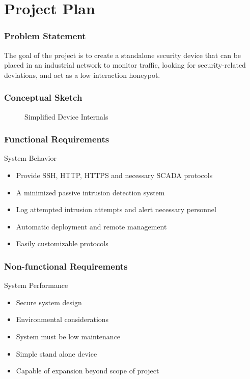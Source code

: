 \section{Project Plan}

\begin{frame}
\frametitle{Problem Statement}

The goal of the project is to create a standalone security device that can be placed in an industrial network to monitor traffic, looking for security-related deviations, and act as a low interaction honeypot.

\end{frame}

\begin{frame}
\frametitle{Conceptual Sketch}
\begin{figure}
\centering
{
\scalebox{0.7}{}
}
\caption{Simplified Device Internals}
\end{figure}
\end{frame}

\begin{frame}
\frametitle{Functional Requirements}
System Behavior
\begin{itemize}
\item Provide SSH, HTTP, HTTPS and necessary SCADA protocols 
\item A minimized passive intrusion detection system
\item Log attempted intrusion attempts and alert necessary personnel 
\item Automatic deployment and remote management
\item Easily customizable protocols
\end{itemize}

\end{frame}

\begin{frame}
\frametitle{Non-functional Requirements}
System Performance
\begin{itemize}
\item Secure system design
\item Environmental considerations
\item System must be low maintenance
\item Simple stand alone device
\item Capable of expansion beyond scope of project
\end{itemize}

\end{frame}

